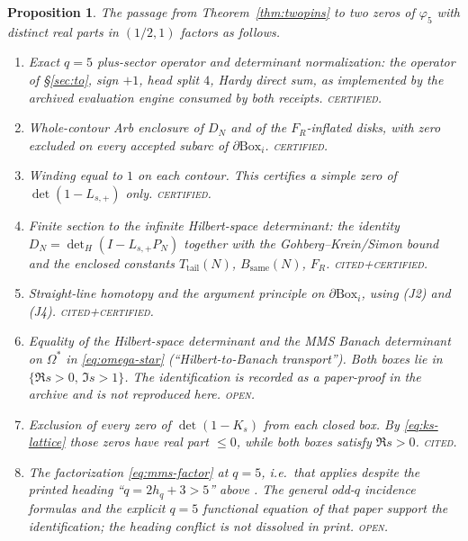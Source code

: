 \documentclass[11pt]{amsart}
\newtheorem{proposition}[theorem]{Proposition}
\theoremstyle{definition}
\theoremstyle{remark}
\newcommand{\phif}{\varphi_5}
\newcommand{\detp}{\det(1-L_{s,+})}
\begin{document}
\begin{proposition}
\label{prop:joints}
The passage from Theorem~\ref{thm:twopins} to two zeros of $\phif$
with distinct real parts in $(1/2,1)$ factors as follows.
\begin{enumerate}
\item[\textup{(J1)}]
Exact $q=5$ plus-sector operator and determinant normalization:
the operator of \S\ref{sec:to}, sign $+1$, head split $4$, Hardy
direct sum, as implemented by the archived evaluation engine consumed by
both receipts.
\textsc{certified}.

\item[\textup{(J2)}]
Whole-contour Arb enclosure of $D_N$ and of the $F_R$-inflated
disks, with zero excluded on every accepted subarc of
$\partial\mathrm{Box}_i$.
\textsc{certified}.

\item[\textup{(J3)}]
Winding equal to $1$ on each contour. This certifies a simple zero
of $\detp$ only.
\textsc{certified}.

\item[\textup{(J4)}]
Finite section to the infinite Hilbert-space determinant: the
identity $D_N=\det_H(I-L_{s,+}P_N)$ together with the
Gohberg--Krein/Simon bound and the enclosed constants
$T_{\mathrm{tail}}(N)$, $B_{\mathrm{same}}(N)$, $F_R$.
\textsc{cited}+\textsc{certified}.

\item[\textup{(J5)}]
Straight-line homotopy and the argument principle on
$\partial\mathrm{Box}_i$, using (J2) and (J4).
\textsc{cited}+\textsc{certified}.

\item[\textup{(J6)}]
Equality of the Hilbert-space determinant and the MMS Banach
determinant on $\Omega^*$ in \eqref{eq:omega-star}
(``Hilbert-to-Banach transport''). Both boxes lie in
$\{\Re s>0,\,\Im s>1\}$. The identification is recorded as a
paper-proof in the archive and is not reproduced here.
\textsc{open}.

\item[\textup{(J7)}]
Exclusion of every zero of $\det(1-K_s)$ from each closed box. By
\eqref{eq:ks-lattice} those zeros have real part $\le 0$, while
both boxes satisfy $\Re s>0$.
\textsc{cited}.

\item[\textup{(J8)}]
The factorization \eqref{eq:mms-factor} at $q=5$, i.e.\ that
\cite[Theorem 6.4]{MMS2012} applies despite the printed heading
``$q=2h_q+3>5$'' above \cite[(34)]{MMS2012}. The general odd-$q$
incidence formulas and the explicit $q=5$ functional equation of
that paper support the identification; the heading conflict is not
dissolved in print.
\textsc{open}.


\end{enumerate}
\end{proposition}
\end{document}
